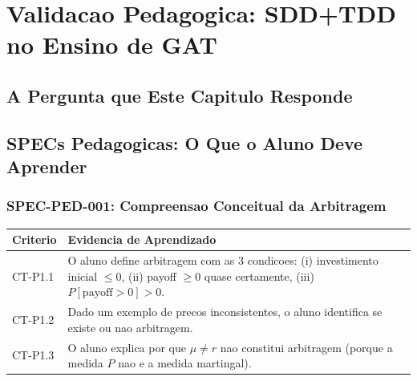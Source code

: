 \chapter{Validacao Pedagogica: SDD+TDD no Ensino de GAT}

\section{A Pergunta que Este Capitulo Responde}

\begin{center}
\end{center}

\section{SPECs Pedagogicas: O Que o Aluno Deve Aprender}

\subsection{SPEC-PED-001: Compreensao Conceitual da Arbitragem}

\begin{center}
\begin{tabular}{p{}p{}}
\toprule
\textbf{Criterio} & \textbf{Evidencia de Aprendizado} \\
\midrule
CT-P1.1 & O aluno define arbitragem com as 3 condicoes: (i) investimento
inicial $\leq 0$, (ii) payoff $\geq 0$ quase certamente, (iii) $P[\text{payoff}>0]>0$. \\
CT-P1.2 & Dado um exemplo de precos inconsistentes, o aluno identifica
se existe ou nao arbitragem. \\
CT-P1.3 & O aluno explica por que $\mu \neq r$ nao constitui arbitragem
(porque a medida $P$ nao e a medida martingal). \\
\bottomrule
\end{tabular}
\end{center}


